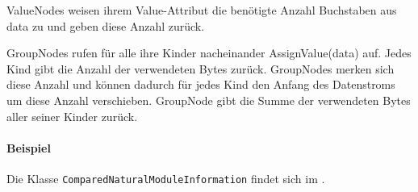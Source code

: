ValueNodes weisen ihrem Value-Attribut die benötigte Anzahl Buchstaben aus data zu und geben diese Anzahl zurück.


GroupNodes rufen für alle ihre Kinder nacheinander AssignValue(data) auf. Jedes Kind gibt die Anzahl der verwendeten Bytes zurück. GroupNodes merken sich diese Anzahl und können dadurch für jedes Kind den Anfang des Datenstroms um diese Anzahl verschieben. GroupNode gibt die Summe der verwendeten Bytes aller seiner Kinder zurück.

\paragraph{Beispiel}
Die Klasse \texttt{Com\-par\-ed\-Na\-tu\-ral\-Mo\-dule\-In\-for\-ma\-tion} findet sich im .  






